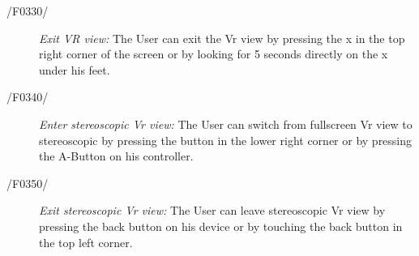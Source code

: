 \begin{description}
  \item[/F0330/]
    \textit{Exit VR view:} The User can exit the Vr view by pressing the x in the top right corner of the screen or by looking for 5 seconds directly on the x under his feet.
\end{description}

\begin{description}
  \item[/F0340/]
    \textit{Enter stereoscopic Vr view:} The User can switch from fullscreen Vr view to stereoscopic by pressing the button in the lower right corner or by pressing the A-Button on his controller.
\end{description}

\begin{description}
  \item[/F0350/]
    \textit{Exit stereoscopic Vr view:} The User can leave stereoscopic Vr view by pressing the back button on his device or by touching the back button in the top left corner.
\end{description}

